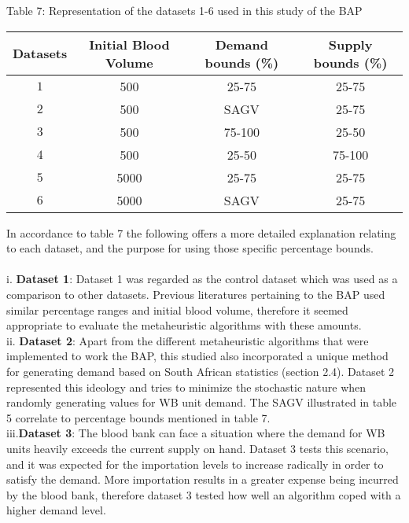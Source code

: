 \documentclass{article}
\begin{document}
\begin {center}
Table 7: {Representation of the datasets 1-6 used in this study of the BAP}

\end {center}
\begin{center}
\begin {tabular}{|c|c|c|c|}
\hline

Datasets& Initial Blood Volume&Demand bounds (\%)&Supply bounds (\%) \\ [0.5ex]
\hline

 $1$&500&25-75&25-75\\
  $2$&500&SAGV&25-75\\
   $3$&500&75-100&25-50\\
    $4$&500&25-50&75-100\\
     $5$&5000&25-75&25-75\\
      $6$&5000&SAGV&25-75\\
\hline

\end {tabular}

\end {center}
In accordance to table 7 the following offers a more detailed explanation relating to each dataset, and the purpose for using those specific percentage bounds.\\
\\
i.	\textbf{Dataset 1}: Dataset 1 was regarded as the control dataset which was used as a comparison to other datasets. Previous literatures pertaining to the BAP used similar percentage ranges and initial blood volume, therefore it seemed appropriate to evaluate the metaheuristic algorithms with these amounts.\\
ii.	\textbf{Dataset 2}: Apart from the different metaheuristic algorithms that were implemented to work the BAP, this studied also incorporated a unique method for generating demand based on South African statistics (section 2.4). Dataset 2 represented this ideology and tries to minimize the stochastic nature when randomly generating values for WB unit demand. The SAGV illustrated in table 5 correlate to percentage bounds mentioned in table 7. \\
iii.\textbf{Dataset 3}: The blood bank can face a situation where the demand for WB units heavily exceeds the current supply on hand. Dataset 3 tests this scenario, and it was expected for the importation levels to increase radically in order to satisfy the demand. More importation results in a greater expense being incurred by the blood bank, therefore dataset 3 tested how well an algorithm coped with a higher demand level.\\
\end{document}
